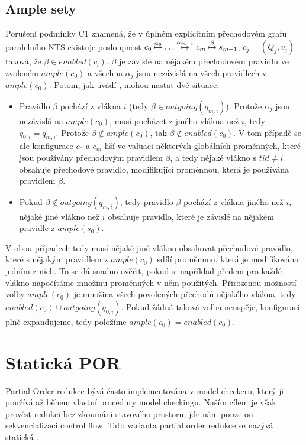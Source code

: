 \documentclass{fithesis2}
\begin{document}
\subsection{Ample sety}
Porušení podmínky C1 \label{subsec:c1-violation} znamená, že v úplném explicitním přechodovém grafu paralelního NTS existuje posloupnost $c_0 \overset{\alpha_0}{\mapsto} \ldots \overset{\alpha_{m-1}}{\mapsto} c_m \overset{\beta}{\mapsto} s_{m+1}$, $c_j = (Q_j, v_j)$ taková, že $\beta \in \mathit{enabled}(c_l)$, $\beta$ je závislé na nějakém přechodovém pravidlu ve zvoleném $\mathit{ample}(c_0)$ a všechna $\alpha_j$ jsou nezávislá na všech pravidlech v $\mathit{ample}(c_0)$. Potom, jak uvádí \cite{CLARKE}, mohou nastat dvě situace.

\begin{itemize}
\item Pravidlo $\beta$ pochází z vlákna $i$ (tedy $\beta \in \mathit{outgoing}(q_{m,i})$).  Protože $\alpha_j$ jsou nezávislá na $\mathit{ample}(c_0)$, musí pocházet z jiného vlákna než $i$, tedy $q_{0,i} = q_{m,i}$. Protože $\beta \not \in \mathit{ample}(c_0)$, tak $\beta \not \in \mathit{enabled}(c_0)$. V tom případě se ale konfigurace $c_0$ a $c_m$ liší ve valuaci některých globálních proměnných, které jsou používány přechodovým pravidlem $\beta$, a tedy nějaké vlákno s $tid \neq i$ obsahuje přechodové pravidlo, modifikující proměnnou, která je používána pravidlem $\beta$.

\item Pokud $\beta \not \in \mathit{outgoing}(q_{m,i})$, tedy pravidlo $\beta$ pochází z vlákna jiného než $i$, nějaké jiné vlákno než $i$ obsahuje pravidlo, které je závislé na nějakém pravidle z $\mathit{ample}(s_0)$.
\end{itemize}

V obou případech tedy musí nějaké jiné vlákno obsahovat přechodové pravidlo, které s nějakým pravidlem z $\mathit{ample}(c_0)$ sdílí proměnnou, která je modifikována jedním z nich. To se dá snadno ověřit, pokud si například předem pro každé vlákno napočítáme množinu proměnných v něm použitých. Přirozenou možností volby $\mathit{ample}(c_0)$ je množina všech povolených přechodů nějakého vlákna, tedy $\mathit{enabled}(c_0) \cup \mathit{outgoing}(q_{0, i})$. Pokud žádná taková volba neuspěje, konfiguraci plně expandujeme, tedy položíme $\mathit{ample}(c_0) = \mathit{enabled}(c_0)$.


\section{Statická POR}
Partial Order redukce bývá často implementována v model checkeru, který ji používá až během vlastní procedury model checkingu. Naším cílem je však provést redukci bez zkoumání stavového prostoru, jde nám pouze on sekvencializaci control flow. Tato varianta partial order redukce se nazývá statická \cite{SPOR}.
\end{document}
